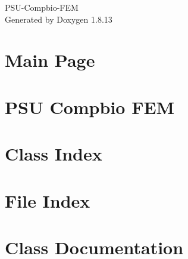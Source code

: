 \documentclass[twoside]{book}
\newcommand{\+}{\discretionary{\mbox{\scriptsize$\hookleftarrow$}}{}{}}
\newcommand{\clearemptydoublepage}{%
  \newpage{\pagestyle{empty}\cleardoublepage}%
}
\begin{document}
\hypersetup{pageanchor=false,
             bookmarksnumbered=true,
             pdfencoding=unicode
            }
\begin{titlepage}
\vspace*{7cm}
\begin{center}%
{\Large P\+S\+U-\/\+Compbio-\/\+F\+EM }\\
\vspace*{1cm}
{\large Generated by Doxygen 1.8.13}\\
\end{center}
\end{titlepage}
\clearemptydoublepage
{}
\tableofcontents
\clearemptydoublepage
{}
\hypersetup{pageanchor=true}

\chapter{Main Page}
\label{index}\hypertarget{index}{}
\chapter{P\+SU Compbio F\+EM}
\label{md__r_e_a_d_m_e}

\chapter{Class Index}

\chapter{File Index}

\chapter{Class Documentation}


\end{document}
